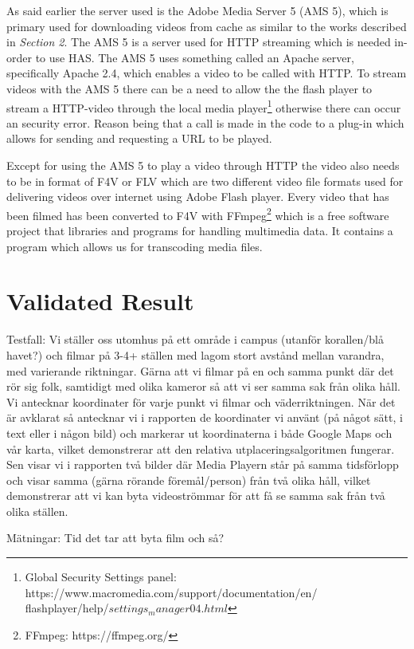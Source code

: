 \documentclass[9pt,a4paper]{acmproc}
\begin{document}
As said earlier the server used is the Adobe Media Server 5 (AMS 5), which is primary used for downloading videos from cache as similar to the works described in \textit{Section 2}. The AMS 5 is a server used for HTTP streaming which is needed in-order to use HAS. The AMS 5 uses something called an Apache server, specifically Apache 2.4, which enables a video to be called with HTTP. To stream videos with the AMS 5 there can be a need to allow the the flash player to stream a HTTP-video through the local media player\footnote{Global Security Settings panel: https://www.macromedia.com/support/documentation/en/ \\flashplayer/help/$settings_manager04.html$} otherwise there can occur an security error. Reason being that a call is made in the code to a plug-in which allows for sending and requesting a URL to be played.

Except for using the AMS 5 to play a video through HTTP the video also needs to be in format of F4V or FLV which are two different video file formats used for delivering videos over internet using Adobe Flash player. Every video that has been filmed has been converted to F4V with FFmpeg\footnote{FFmpeg: https://ffmpeg.org/} which is a free software project that libraries and programs for handling multimedia data. It contains a program which allows us for transcoding media files.


\section{Validated Result}
Testfall:
Vi ställer oss utomhus på ett område i campus (utanför korallen/blå havet?) och filmar på 3-4+ ställen med lagom stort avstånd mellan varandra, med varierande riktningar. Gärna att vi filmar på en och samma punkt där det rör sig folk, samtidigt med olika kameror så att vi ser samma sak från olika håll. Vi antecknar koordinater för varje punkt vi filmar och väderriktningen.
När det är avklarat så antecknar vi i rapporten de koordinater vi använt (på något sätt, i text eller i någon bild) och markerar ut koordinaterna i både Google Maps och vår karta, vilket demonstrerar att den relativa utplaceringsalgoritmen fungerar. Sen visar vi i rapporten två bilder där Media Playern står på samma tidsförlopp och visar samma (gärna rörande föremål/person) från två olika håll, vilket demonstrerar att vi kan byta videoströmmar för att få se samma sak från två olika ställen.

Mätningar:
Tid det tar att byta film och så?
\end{document}
